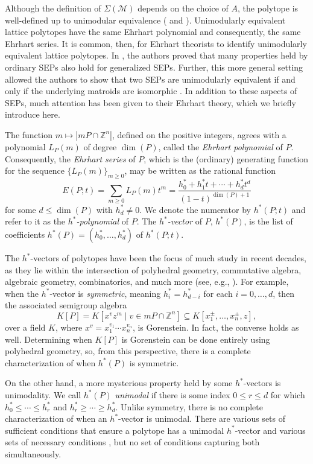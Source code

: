 \documentclass{amsart}
\numberwithin{equation}{section}
\theoremstyle{plain}
\theoremstyle{definition}
\newcommand{\ZZ}{\mathbb{Z}}
\newcommand{\calM}{\mathcal{M}}
\begin{document}
    Although the definition of $\Sigma(\calM)$ depends on the choice of $A$, the polytope is well-defined up to unimodular equivalence (\cite[Proposition 3.2]{Tothmeresz} and \cite[Theorem~3.2]{DJKK}). 
    Unimodularly equivalent lattice polytopes have the same Ehrhart polynomial and consequently, the same Ehrhart series.
    It is common, then, for Ehrhart theorists to identify unimodularly equivalent lattice polytopes.
    In \cite{DJKK}, the authors proved that many properties held by ordinary SEPs also hold for generalized SEPs. 
    Further, this more general setting allowed the authors to show that two SEPs are unimodularly equivalent if and only if the underlying matroids are isomorphic \cite[Theorem 4.6]{DJKK}.
    In addition to these aspects of SEPs, much attention has been given to their Ehrhart theory, which we briefly introduce here.
    
    The function $m \mapsto |mP \cap \ZZ^n|$, defined on the positive integers, agrees with a polynomial $L_P(m)$ of degree $\dim(P)$, called the \emph{Ehrhart polynomial} of $P$.
    Consequently, the \emph{Ehrhart series} of $P$, which is the (ordinary) generating function for the sequence $\{L_P(m)\}_{m \geq 0}$, may be written as the rational function
    \[
        E(P;t) = \sum_{m \geq 0} L_P(m)t^m = \frac{h_0^* + h_1^*t + \cdots + h_d^*t^d}{(1-t)^{\dim(P)+1}}
    \]
    for some $d \leq \dim(P)$ with $h_d^* \neq 0$.
    We denote the numerator by $h^*(P;t)$ and refer to it as the \emph{$h^*$-polynomial} of $P$.
    The \emph{$h^*$-vector} of $P$, $h^*(P)$, is the list of coefficients $h^*(P) = (h^*_0,\dots,h^*_d)$ of $h^*(P;t)$.

    The $h^*$-vectors of polytopes have been the focus of much study in recent decades, as they lie within the intersection of polyhedral geometry, commutative algebra, algebraic geometry, combinatorics, and much more (see, e.g., \cite{StanleyGreenBook, sturmfels}).
    For example, when the $h^*$-vector is \emph{symmetric}, meaning $h^*_i = h^*_{d-i}$ for each $i = 0,\dots,d$, then the associated semigroup algebra
    \[
        K[P] = K[x^vz^m \mid v \in mP \cap \ZZ^n] \subseteq K[x_1^{\pm},\dots,x_n^{\pm},z],
    \]
    over a field $K$, where $x^v = x_1^{v_1}\cdots x_n^{v_n}$, is Gorenstein.
    In fact, the converse holds as well.
    Determining when $K[P]$ is Gorenstein can be done entirely using polyhedral geometry, so, from this perspective, there is a complete characterization of when $h^*(P)$ is symmetric.

    On the other hand, a more mysterious property held by some $h^*$-vectors is unimodality.
    We call $h^*(P)$ \emph{unimodal} if there is some index $0 \leq r \leq d$ for which $h^*_0 \leq \cdots \leq h^*_r$ and $h^*_r \geq \cdots \geq h^*_d$.
    Unlike symmetry, there is no complete characterization of when an $h^*$-vector is unimodal.
    There are various sets of sufficient conditions that ensure a polytope has a unimodal $h^*$-vector and various sets of necessary conditions \cite{BraunUnimodality}, but no set of conditions capturing both simultaneously.
\end{document}
